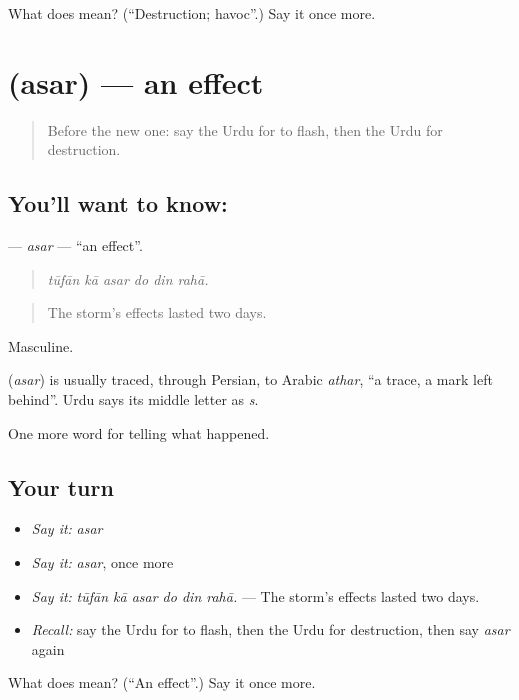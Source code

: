\begin{tcolorbox}[breakable,colback=teal!4,colframe=teal!35!black,title={Before you move on}]
What does  mean? (\textquotedblleft{}Destruction; havoc\textquotedblright{}.) Say it once more.
\end{tcolorbox}
\section[\texorpdfstring{\ur{اثر} (asar)}{اثر (asar)}]{ (asar) — an effect}

\label{lesson:UR-C292-asar}



\begin{quote}
Before the new one: say the Urdu for to flash, then the Urdu for destruction.
\end{quote}

\subsection*{You'll want to know: }
\textbf{} — \emph{asar} — \textquotedblleft{}an effect\textquotedblright{}.

\begin{quote}
     
\end{quote}

\begin{quote}
\emph{tūfān kā asar do din rahā.}
\end{quote}

\begin{quote}
The storm's effects lasted two days.
\end{quote}

Masculine.

\begin{cousinweb}
\textbf{} (\emph{asar}) is usually traced, through Persian, to Arabic \emph{athar}, \textquotedblleft{}a trace, a mark left behind\textquotedblright{}. Urdu says its middle letter as \emph{s}.
\end{cousinweb}

\begin{grammarlens}[title={What you've built}]
One more word for telling what happened.
\end{grammarlens}

\subsection*{Your turn}
\begin{itemize}
\raggedright
  \item \emph{Say it:} \emph{asar}
  \item \emph{Say it:} \emph{asar}, once more
  \item \emph{Say it:} \emph{tūfān kā asar do din rahā.} — The storm's effects lasted two days.
  \item \emph{Recall:} say the Urdu for to flash, then the Urdu for destruction, then say \emph{asar} again
\end{itemize}

\begin{tcolorbox}[breakable,colback=teal!4,colframe=teal!35!black,title={Before you move on}]
What does  mean? (\textquotedblleft{}An effect\textquotedblright{}.) Say it once more.
\end{tcolorbox}
